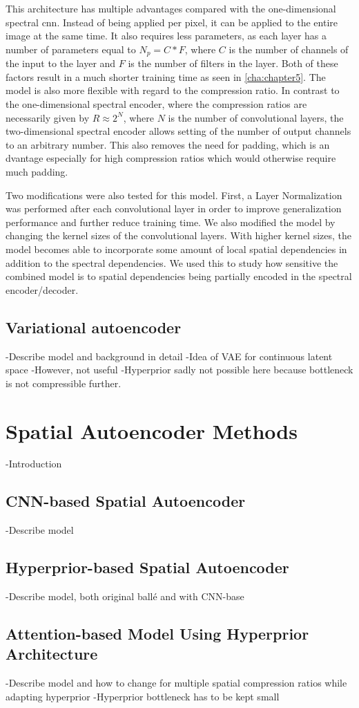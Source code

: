 This architecture has multiple advantages compared with the one-dimensional spectral \ac{cnn}. Instead of being applied per pixel, it can be applied to the entire image at the same time. It also requires less parameters, as each layer has a number of parameters equal to $N_p = C * F$, where $C$ is the number of channels of the input to the layer and $F$ is the number of filters in the layer. Both of these factors result in a much shorter training time as seen in \autoref{cha:chapter5}. The model is also more flexible with regard to the compression ratio. In contrast to the one-dimensional spectral encoder, where the compression ratios are necessarily given by $R \approx 2^N$, where $N$ is the number of convolutional layers, the two-dimensional spectral encoder allows setting of the number of output channels to an arbitrary number. This also removes the need for padding, which is an dvantage especially for high compression ratios which would otherwise require much padding.

Two modifications were also tested for this model. First, a Layer Normalization was performed after each convolutional layer in order to improve generalization performance and further reduce training time.  We also modified the model by changing the kernel sizes of the convolutional layers. With higher kernel sizes, the model becomes able to incorporate some amount of local spatial dependencies in addition to the spectral dependencies. We used this to study how sensitive the combined model is to spatial dependencies being partially encoded in the spectral encoder/decoder.
\subsection{Variational autoencoder \label{sec:vae}}
-Describe model and background in detail
-Idea of VAE for continuous latent space
-However, not useful
-Hyperprior sadly not possible here because bottleneck is not compressible further.

\section{Spatial Autoencoder Methods\label{sec:spatialae}}
-Introduction
\subsection{CNN-based Spatial Autoencoder}
-Describe model

\subsection{Hyperprior-based Spatial Autoencoder}
-Describe model, both original ballé and with CNN-base

\subsection{Attention-based Model Using Hyperprior Architecture}
-Describe model and how to change for multiple spatial compression ratios while adapting hyperprior
-Hyperprior bottleneck has to be kept small
